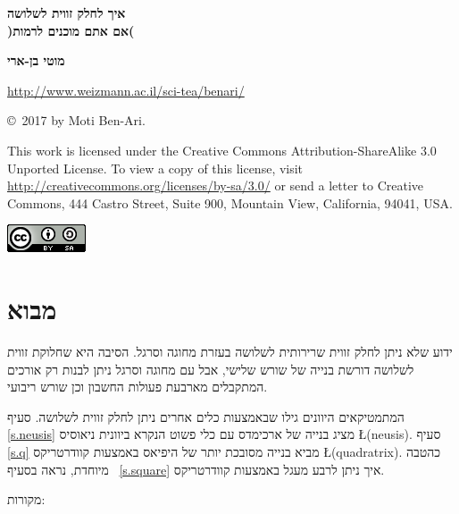 \documentclass[12pt,a4paper]{article}
\newcommand*{\qd}{קוודרטריקס}
\begin{document}
\thispagestyle{empty}


\begin{center}
\textbf{\Huge%
איך לחלק זווית לשלושה\\
\medskip
)אם אתם מוכנים לרמות(
}

\bigskip

\bigskip

\textbf{\LARGE מוטי בן-ארי}

\bigskip

\url{http://www.weizmann.ac.il/sci-tea/benari/}

\bigskip

\copyright{}\  2017 by Moti Ben-Ari.
\end{center}

{\footnotesize This work is licensed under the Creative Commons Attribution-ShareAlike 3.0 Unported License. To view a copy of this license, visit \url{http://creativecommons.org/licenses/by-sa/3.0/} or send a letter to Creative Commons, 444 Castro Street, Suite 900, Mountain View, California, 94041, USA.}

\begin{center}
\includegraphics[width=.15\textwidth]{../by-sa.png}
\end{center}



\section{מבוא}

ידוע שלא ניתן לחלק זווית שרירותית לשלושה בעזרת מחוגה וסרגל. הסיבה היא שחלוקת זווית לשלושה דורשת בנייה של שורש שלישי, אבל עם מחוגה וסרגל ניתן לבנות רק אורכים המתקבלים מארבעת פעולות החשבון וכן שורש ריבועי.

המתמטיקאים היוונים גילו שבאמצעות כלים אחרים ניתן לחלק זווית לשלושה. סעיף~%
\ref{s.neusis}
מציג בנייה של ארכימדס עם כלי פשוט הנקרא ביוונית ניאוסיס
\L{(neusis)}.
סעיף~%
\ref{s.q}
מביא בנייה מסובכת יותר של היפיאס באמצעות
\qd{}
\L{(quadratrix)}.
כהטבה מיוחדת, נראה בסעיף~%
\ref{s.square}
איך ניתן לרבע מעגל באמצעות 
\qd{}.


מקורות:
\end{document}
